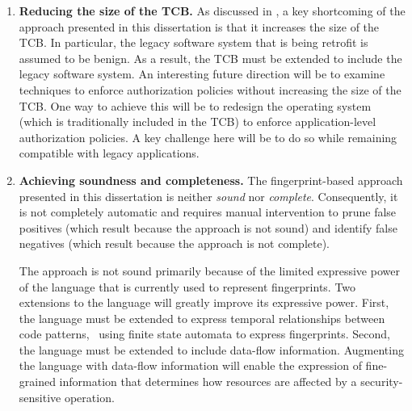 \begin{enumerate}
%
\item \textbf{Reducing the size of the TCB.} As discussed in
, a key shortcoming of the approach presented in
this dissertation is that it increases the size of the TCB. In particular, the
legacy software system that is being retrofit is assumed to be benign. As a
result, the TCB must be extended to include the legacy software system. An
interesting future direction will be to examine techniques to enforce
authorization policies without increasing the size of the TCB. One way to
achieve this will be to redesign the operating system (which is traditionally
included in the TCB) to enforce application-level authorization policies. A key
challenge here will be to do so while remaining compatible with legacy
applications.

\item \textbf{Achieving soundness and completeness.} The fingerprint-based
approach presented in this dissertation is neither \textit{sound} nor
\textit{complete}.  Consequently, it is not completely automatic and requires
manual intervention to prune false positives (which result because the approach
is not sound) and identify false negatives (which result because the approach
is not complete).

The approach is not sound primarily because of the limited expressive power of
the language that is currently used to represent fingerprints. Two extensions
to the language will greatly improve its expressive power. First, the language
must be extended to express temporal relationships between code patterns,
\eg~using finite state automata to express fingerprints. Second, the language
must be extended to include data-flow information. Augmenting the language with
data-flow information will enable the expression of fine-grained information
that determines how resources are affected by a security-sensitive operation.


\end{enumerate}
